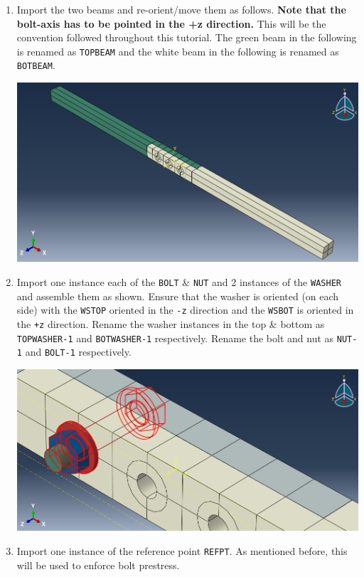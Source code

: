 \documentclass[11pt]{article}
\begin{document}
\begin{enumerate}
\item Import the two beams and re-orient/move them as follows.
\textbf{Note that the bolt-axis has to be pointed in the +z direction.}
This will be the convention followed throughout this tutorial.
The green beam in the following is renamed as \texttt{TOPBEAM} and the white beam in the following is renamed as \texttt{BOTBEAM}.
\begin{center}
\includegraphics[width=.9\linewidth]{./figs/asb1.png}
\end{center}
\item Import one instance each of the \texttt{BOLT} \& \texttt{NUT} and 2 instances of the \texttt{WASHER} and assemble them as shown.
Ensure that the washer is oriented (on each side) with the \texttt{WSTOP} oriented in the \texttt{-z} direction and the \texttt{WSBOT} is oriented in the \texttt{+z} direction.
Rename the washer instances in the top \& bottom as \texttt{TOPWASHER-1} and \texttt{BOTWASHER-1} respectively.
Rename the bolt and nut as \texttt{NUT-1} and \texttt{BOLT-1} respectively.
\begin{center}
\includegraphics[width=.9\linewidth]{./figs/asbwn.png}
\end{center}
\item Import one instance of the reference point \texttt{REFPT}.
As mentioned before, this will be used to enforce bolt prestress.

\end{enumerate}
\end{document}
